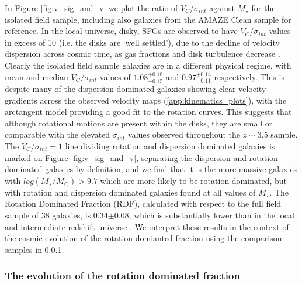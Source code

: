 \documentclass[fleqn,usenatbib]{mn2e}
\begin{document}
In Figure \ref{fig:v_sig_and_v} we plot the ratio of $V_{C}$/$\sigma_{int}$ against $M_{\star}$ for the isolated field sample, including also galaxies from the AMAZE Clean sample for reference.
In the local universe, disky, SFGs are observed to have $V_{C}/\sigma_{int}$ values in excess of 10 (i.e. the disks are `well settled'), due to the decline of velocity dispersion across cosmic time, as gas fractions and disk turbulence decrease \citep[e.g.][]{Epinat2008,Epinat2008a}.
Clearly the isolated field sample galaxies are in a different physical regime, with mean and median $V_{C}/\sigma_{int}$ values of $1.08^{+0.18}_{-0.15}$ and $0.97^{+0.14}_{-0.11}$ respectively.
This is despite many of the dispersion dominated galaxies showing clear velocity gradients across the observed velocity maps (\cref{app:kinematics_plots}), with the arctangent model providing a good fit to the rotation curves.
This suggests that although rotational motions are present within the disks, they are small or comparable with the elevated $\sigma_{int}$ values observed throughout the $z \sim 3.5$ sample. \\

The $V_{C}$/$\sigma_{int}=1$ line dividing rotation and dispersion dominated galaxies is marked on Figure \ref{fig:v_sig_and_v}, separating the dispersion and rotation dominated galaxies by definition, and we find that it is the more massive galaxies with $log(M_{\star}/M_{\odot}) > 9.7$ which are more likely to be rotation dominated, but with rotation and dispersion dominated galaxies found at all values of $M_{\star}$.
The Rotation Dominated Fraction (RDF), calculated with respect to the full field sample of 38 galaxies, is 0.34$\pm0.08$, which is substantially lower than in the local and intermediate redshift universe \citep[e.g.][]{Epinat2008a,Epinat2008,Green2014}.
We interpret these results in the context of the cosmic evolution of the rotation domianted fraction using the comparison samples in \cref{subsubsec:RDF_evolution}.\\

\subsubsection{The evolution of the rotation dominated fraction}\label{subsubsec:RDF_evolution}
\end{document}
